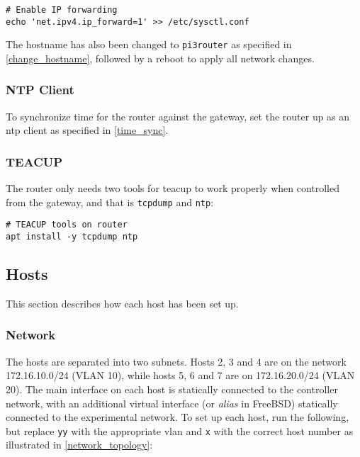 \begin{verbatim}
# Enable IP forwarding
echo 'net.ipv4.ip_forward=1' >> /etc/sysctl.conf
\end{verbatim}

The hostname has also been changed to \lstinline{pi3router} as specified in \ref{change_hostname}, followed by a reboot to apply all network changes.


\subsubsection{NTP Client}

To synchronize time for the router against the gateway, set the router up as an \gls{ntp} client as specified in \ref{time_sync}.


\subsubsection{TEACUP}

The router only needs two tools for \gls{teacup} to work properly when controlled from the gateway, and that is \lstinline{tcpdump} and \lstinline{ntp}:

\begin{verbatim}
# TEACUP tools on router
apt install -y tcpdump ntp
\end{verbatim}



\subsection{Hosts}

This section describes how each host has been set up. 


\subsubsection{Network}

The hosts are separated into two subnets. Hosts 2, 3 and 4 are on the network 172.16.10.0/24 (VLAN 10), while hosts 5, 6 and 7 are on 172.16.20.0/24 (VLAN 20). The main interface on each host is statically connected to the controller network, with an additional virtual interface (or \textit{alias} in FreeBSD) statically connected to the experimental network. To set up each host, run the following, but replace \lstinline{yy} with the appropriate \gls{vlan} and \lstinline{x} with the correct host number as illustrated in \ref{network_topology}:

